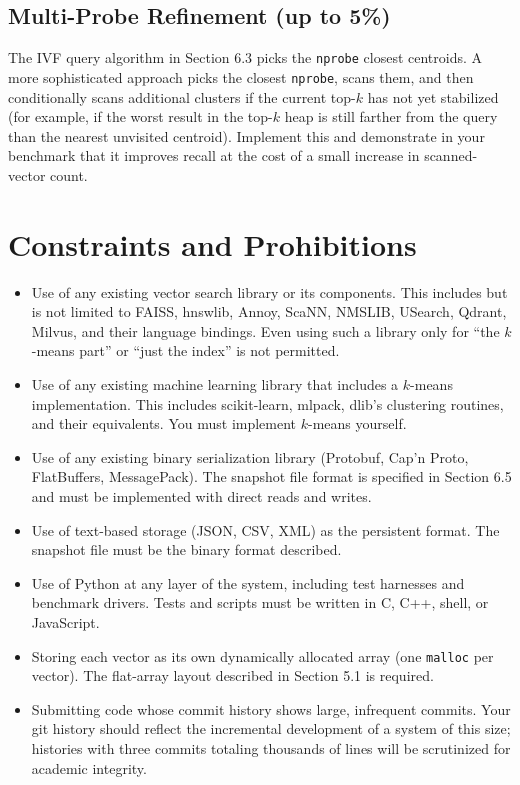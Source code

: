 \documentclass[11pt,a4paper]{article}
\begin{document}
\subsection{Multi-Probe Refinement (up to 5\%)}
The IVF query algorithm in Section 6.3 picks the \texttt{nprobe} closest centroids. A more sophisticated approach picks the closest \texttt{nprobe}, scans them, and then conditionally scans additional clusters if the current top-$k$ has not yet stabilized (for example, if the worst result in the top-$k$ heap is still farther from the query than the nearest unvisited centroid). Implement this and demonstrate in your benchmark that it improves recall at the cost of a small increase in scanned-vector count.

\section{Constraints and Prohibitions}

\begin{notebox}
\begin{itemize}
\item Use of any existing vector search library or its components. This includes but is not limited to FAISS, hnswlib, Annoy, ScaNN, NMSLIB, USearch, Qdrant, Milvus, and their language bindings. Even using such a library only for ``the $k$-means part'' or ``just the index'' is not permitted.
\item Use of any existing machine learning library that includes a $k$-means implementation. This includes scikit-learn, mlpack, dlib's clustering routines, and their equivalents. You must implement $k$-means yourself.
\item Use of any existing binary serialization library (Protobuf, Cap'n Proto, FlatBuffers, MessagePack). The snapshot file format is specified in Section 6.5 and must be implemented with direct reads and writes.
\item Use of text-based storage (JSON, CSV, XML) as the persistent format. The snapshot file must be the binary format described.
\item Use of Python at any layer of the system, including test harnesses and benchmark drivers. Tests and scripts must be written in C, C++, shell, or JavaScript.
\item Storing each vector as its own dynamically allocated array (one \texttt{malloc} per vector). The flat-array layout described in Section 5.1 is required.
\item Submitting code whose commit history shows large, infrequent commits. Your git history should reflect the incremental development of a system of this size; histories with three commits totaling thousands of lines will be scrutinized for academic integrity.
\end{itemize}
\end{notebox}
\end{document}
